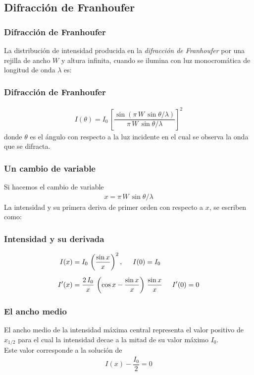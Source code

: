 \subsection{Difracción de Franhoufer}
\begin{frame}
\frametitle{Difracción de Franhoufer}
La distribución de intensidad producida en la \emph{difracción de Franhoufer} por una rejilla de ancho $W$ y altura infinita, cuando se ilumina con luz monocromática de longitud de onda $\lambda$ es:
\end{frame}
\begin{frame}
\frametitle{Difracción de Franhoufer}
\begin{align}
I(\theta) = I_{0} \, \left[ \dfrac{\sin(\pi \, W \, \sin \theta / \lambda)}{\pi \, W \, \sin \theta / \lambda} \right]^{2}
\label{eq:ecuacion_6_62}
\end{align}
donde $\theta$ es el ángulo con respecto a la luz incidente en el cual se observa la onda que se difracta.
\end{frame}
\begin{frame}
\frametitle{Un cambio de variable}
Si hacemos el cambio de variable
\begin{align}
x = \pi \, W \, \sin \theta / \lambda
\label{eq:ecuacion_6_63}
\end{align}
La intensidad y su primera deriva de primer orden con respecto a $x$, se escriben como:
\end{frame}
\begin{frame}
\frametitle{Intensidad y su derivada}
\begin{align}
I(x) &= I_{0} \, \left( \dfrac{\sin x}{x} \right)^{2}, \hspace{0.5cm} I(0) = I_{0} \label{eq:ecuacion_6_64} \\[0.5em]
I^{\prime}(x) &= \dfrac{2 \, I_{0}}{x} \, \left( \cos x - \dfrac{\sin x}{x} \right) \, \dfrac{\sin x}{x} \hspace{0.5cm} I^{\prime}(0) = 0 \label{eq:ecuacion_6_65} 
\end{align}
\end{frame}
\begin{frame}
\frametitle{El ancho medio}
El ancho medio de la intensidad máxima central representa el valor positivo de $x_{1/2}$ para el cual la intensidad decae a la mitad de su valor máximo $I_{0}$.
\\
\bigskip
Este valor corresponde a la solución de
\begin{align}
I(x) - \dfrac{I_{0}}{2} = 0
\label{eq:ecuacion_6_66}
\end{align}
\end{frame}
